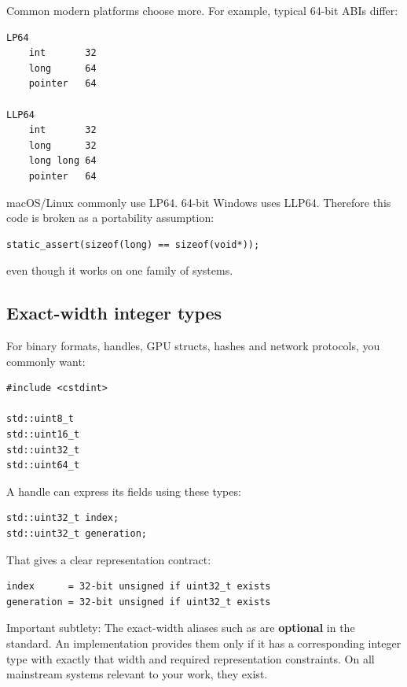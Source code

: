 Common modern platforms choose more. For example, typical 64-bit ABIs differ:

\begin{verbatim}
LP64
    int       32
    long      64
    pointer   64

LLP64
    int       32
    long      32
    long long 64
    pointer   64
\end{verbatim}

macOS/Linux commonly use LP64. 64-bit Windows uses LLP64. Therefore this code is broken as a portability assumption:

\begin{verbatim}
static_assert(sizeof(long) == sizeof(void*));
\end{verbatim}

even though it works on one family of systems.

\subsection{Exact-width integer types}\label{05-engine-i-ch002-exact-width-integer-types}

\hypertarget{05-engine-i-ch002-exact-width-integer-types}{}

For binary formats, handles, GPU structs, hashes and network protocols, you commonly want:

\begin{verbatim}
#include <cstdint>

std::uint8_t
std::uint16_t
std::uint32_t
std::uint64_t
\end{verbatim}

A handle can express its fields using these types:

\begin{verbatim}
std::uint32_t index;
std::uint32_t generation;
\end{verbatim}

That gives a clear representation contract:

\begin{verbatim}
index      = 32-bit unsigned if uint32_t exists
generation = 32-bit unsigned if uint32_t exists
\end{verbatim}

Important subtlety: The exact-width aliases such as  are \textbf{optional} in the standard. An implementation provides them only if it has a corresponding integer type with exactly that width and required representation constraints. On all mainstream systems relevant to your work, they exist.

